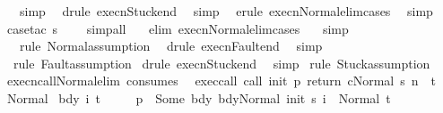\begin{isabellebody}
\isamarkupfalse%
\ \ \ simp\isanewline
{}\isamarkupfalse%
\ \ {\isacharparenleft}drule\ execn{\isacharunderscore}Stuck{\isacharunderscore}end{\isacharparenright}\ \isamarkupfalse%
\ simp\isanewline
{}\isamarkupfalse%
\ \ {\isacharparenleft}erule\ execn{\isacharunderscore}Normal{\isacharunderscore}elim{\isacharunderscore}cases{\isacharparenright}\isanewline
{}\isamarkupfalse%
\ \ simp\isanewline
{}\isamarkupfalse%
\ {\isacharparenleft}case{\isacharunderscore}tac\ s{\isacharprime}{\isacharparenright}\isanewline
{}\isamarkupfalse%
\ \ \ \ simp{\isacharunderscore}all\isanewline
{}\isamarkupfalse%
\ \ \ {\isacharparenleft}elim\ execn{\isacharunderscore}Normal{\isacharunderscore}elim{\isacharunderscore}cases{\isacharparenright}\isanewline
{}\isamarkupfalse%
\ \ \ simp\isanewline
{}\isamarkupfalse%
\ \ \ {\isacharparenleft}rule\ Normal{\isacharcomma}assumption{\isacharplus}{\isacharparenright}\isanewline
{}\isamarkupfalse%
\ \ {\isacharparenleft}drule\ execn{\isacharunderscore}Fault{\isacharunderscore}end{\isacharparenright}\ \isamarkupfalse%
\ simp\isanewline
{}\isamarkupfalse%
\ \ {\isacharparenleft}rule\ Fault{\isacharcomma}assumption{\isacharplus}{\isacharparenright}\isanewline
{}\isamarkupfalse%
\ {\isacharparenleft}drule\ execn{\isacharunderscore}Stuck{\isacharunderscore}end{\isacharparenright}\ \isamarkupfalse%
\ simp\isanewline
{}\isamarkupfalse%
\ {\isacharparenleft}rule\ Stuck{\isacharcomma}assumption{\isacharplus}{\isacharparenright}\isanewline
{}\isamarkupfalse%
%
\endisatagproof
{\isafoldproof}%
%
\isadelimproof
\isanewline
%
\endisadelimproof
\isanewline
{}\isamarkupfalse%
\ execn{\isacharunderscore}call{\isacharunderscore}Normal{\isacharunderscore}elim\ {\isacharbrackleft}consumes\ {}{\isacharbrackright}{\isacharcolon}\isanewline
{}\ exec{\isacharunderscore}call{\isacharcolon}\ {\isachardoublequoteopen}{\isasymGamma}{\isasymturnstile}{\isasymlangle}call\ init\ p\ return\ c{\isacharcomma}Normal\ s{\isasymrangle}\ {\isacharequal}n{\isasymRightarrow}\ \ t{\isachardoublequoteclose}\isanewline
{}\ Normal{\isacharcolon}\isanewline
\ {\isachardoublequoteopen}{\isasymAnd}bdy\ i\ t{\isacharprime}{\isachardot}\isanewline
\ \ \ \ {\isasymlbrakk}{\isasymGamma}\ p\ {\isacharequal}\ Some\ bdy{\isacharsemicolon}\ {\isasymGamma}{\isasymturnstile}{\isasymlangle}bdy{\isacharcomma}Normal\ {\isacharparenleft}init\ s{\isacharparenright}{\isasymrangle}\ {\isacharequal}i{\isasymRightarrow}\ \ Normal\ t{\isacharprime}{\isacharsemicolon}\ \isanewline

\end{isabellebody}
